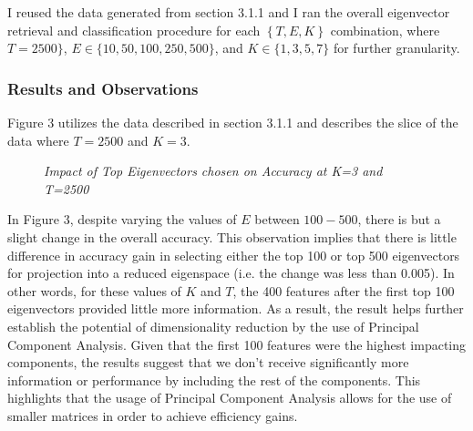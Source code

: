 \documentclass{article} %
\begin{document}
I reused the data generated from section 3.1.1 and I ran the overall eigenvector retrieval and classification procedure for each \(\left\{ T,E,K \right\}\) combination, where \(T = 2500\}\), \(E \in \{10, 50, 100, 250, 500\}\), and \(K \in \{1,3,5,7\}\) for further granularity. 

\subsubsection{Results and Observations}

Figure 3 utilizes the data described in section 3.1.1 and describes the slice of the data where \(T=2500\) and \(K=3\). 

\begin{figure}[h]%
	\centering
    	\hfill%
    \caption{\textit{Impact of Top Eigenvectors chosen on Accuracy at K=3 and T=2500}}
    \label{fig:default}
\end{figure}

In Figure 3, despite varying the values of \(E\) between \(100-500\), there is but a slight change in the overall accuracy. This observation implies that there is little difference in accuracy gain in selecting either the top 100 or top 500 eigenvectors for projection into a reduced eigenspace (i.e. the change was less than 0.005). In other words, for these values of \(K\) and \(T\), the 400 features after the first top 100 eigenvectors provided little more information. As a result, the result helps further establish the potential of dimensionality reduction by the use of Principal Component Analysis. Given that the first 100 features were the highest impacting components, the results suggest that we don't receive significantly more information or performance by including the rest of the components. This highlights that the usage of Principal Component Analysis allows for the use of smaller matrices in order to achieve efficiency gains.
\end{document}
